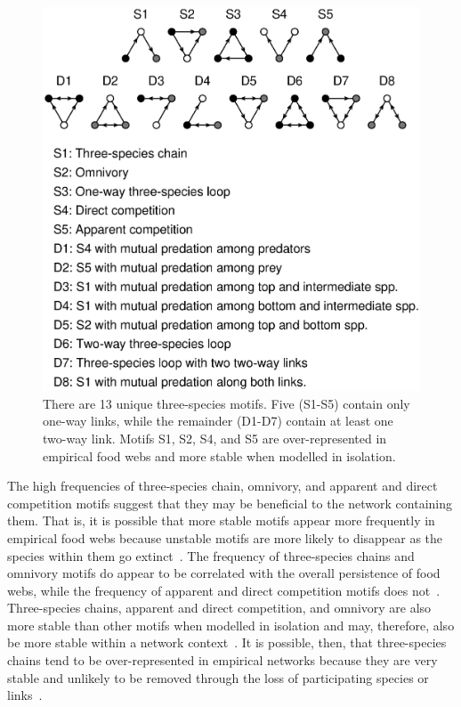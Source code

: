 \documentclass[12pt]{article}
\begin{document}
    
    \begin{figure}[hb!]
        \centering
        \includegraphics[width=.75\textwidth]{figures/motifs.eps}
        \caption{There are 13 unique three-species motifs. Five (S1-S5) contain only one-way links, while the remainder (D1-D7) contain at least one two-way link. Motifs S1, S2, S4, and S5 are over-represented in empirical food webs and more stable when modelled in isolation.}
        \label{motifs}
    \end{figure}


	The high frequencies of three-species chain, omnivory, and apparent and direct competition motifs suggest that they may be beneficial to the network containing them. That is, it is possible that more stable motifs appear more frequently in empirical food webs because unstable motifs are more likely to disappear as the species within them go extinct~\citep{Borrelli2015,Borrelli2015a}. The frequency of three-species chains and omnivory motifs do appear to be correlated with the overall persistence of  food webs, while the frequency of apparent and direct competition motifs does not~\citep{Stouffer2010}. Three-species chains, apparent and direct competition, and omnivory are also more stable than other motifs when modelled in isolation and may, therefore, also be more stable within a network context~\citep{Borrelli2015a}. It is possible, then, that three-species chains tend to be over-represented in empirical networks because they are very stable and unlikely to be removed through the loss of participating species or links~\citep{Borrelli2015}.  
\end{document}
